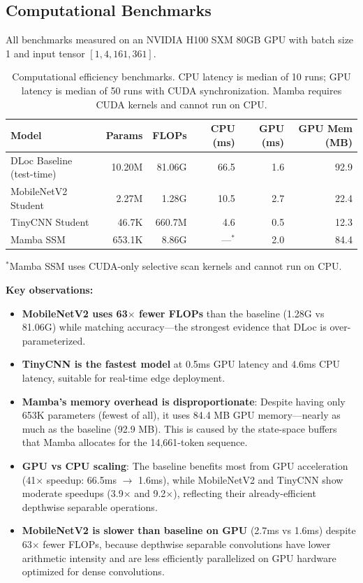 \documentclass[11pt,a4paper]{article}
\begin{document}
\subsection{Computational Benchmarks}

All benchmarks measured on an NVIDIA H100 SXM 80GB GPU with batch size 1 and input tensor $[1, 4, 161, 361]$.

\begin{table}[H]
\centering
\caption{Computational efficiency benchmarks. CPU latency is median of 10 runs; GPU latency is median of 50 runs with CUDA synchronization. Mamba requires CUDA kernels and cannot run on CPU.}
\label{tab:benchmarks}
\begin{tabular}{lrrrrr}
\toprule
\textbf{Model} & \textbf{Params} & \textbf{FLOPs} & \textbf{CPU (ms)} & \textbf{GPU (ms)} & \textbf{GPU Mem (MB)} \\
\midrule
DLoc Baseline (test-time) & 10.20M & 81.06G & 66.5 & 1.6 & 92.9 \\
MobileNetV2 Student & 2.27M & 1.28G & 10.5 & 2.7 & 22.4 \\
TinyCNN Student & 46.7K & 660.7M & 4.6 & 0.5 & 12.3 \\
Mamba SSM & 653.1K & 8.86G & ---$^*$ & 2.0 & 84.4 \\
\bottomrule
\end{tabular}
\begin{flushleft}
\small $^*$Mamba SSM uses CUDA-only selective scan kernels and cannot run on CPU.
\end{flushleft}
\end{table}

\noindent\textbf{Key observations:}
\begin{itemize}[leftmargin=*]
    \item \textbf{MobileNetV2 uses 63$\times$ fewer FLOPs} than the baseline (1.28G vs 81.06G) while matching accuracy---the strongest evidence that DLoc is over-parameterized.
    \item \textbf{TinyCNN is the fastest model} at 0.5ms GPU latency and 4.6ms CPU latency, suitable for real-time edge deployment.
    \item \textbf{Mamba's memory overhead is disproportionate}: Despite having only 653K parameters (fewest of all), it uses 84.4 MB GPU memory---nearly as much as the baseline (92.9 MB). This is caused by the state-space buffers that Mamba allocates for the 14,661-token sequence.
    \item \textbf{GPU vs CPU scaling}: The baseline benefits most from GPU acceleration (41$\times$ speedup: 66.5ms $\to$ 1.6ms), while MobileNetV2 and TinyCNN show moderate speedups (3.9$\times$ and 9.2$\times$), reflecting their already-efficient depthwise separable operations.
    \item \textbf{MobileNetV2 is slower than baseline on GPU} (2.7ms vs 1.6ms) despite 63$\times$ fewer FLOPs, because depthwise separable convolutions have lower arithmetic intensity and are less efficiently parallelized on GPU hardware optimized for dense convolutions.
\end{itemize}
\end{document}
